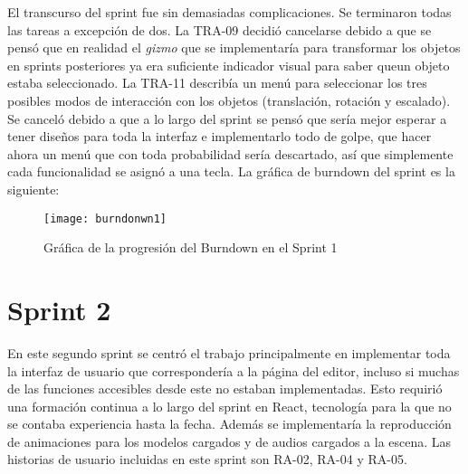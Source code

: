 El transcurso del sprint fue sin demasiadas complicaciones. Se terminaron todas las tareas a excepción de dos. La TRA-09 decidió cancelarse debido a que se pensó que en realidad el \textit{gizmo} que se implementaría para transformar los objetos en sprints posteriores ya era suficiente indicador visual para saber queun objeto estaba seleccionado. La TRA-11 describía un menú para seleccionar los tres posibles modos de interacción con los objetos (translación, rotación y escalado). Se canceló debido a que a lo largo del sprint se pensó que sería mejor esperar a tener diseños para toda la interfaz e implementarlo todo de golpe, que hacer ahora un menú que con toda probabilidad sería descartado, así que simplemente cada funcionalidad se asignó a una tecla. La gráfica de burndown del sprint es la siguiente:

\begin{figure}[h]
    \centering
    \texttt{[image: burndonwn1]}
    \caption[Burndown Sprint 1]{Gráfica de la progresión del Burndown en el Sprint 1}
\end{figure}

\section{Sprint 2}

En este segundo sprint se centró el trabajo principalmente en implementar toda la interfaz de usuario que correspondería a la página del editor, incluso si muchas de las funciones accesibles desde este no estaban implementadas. Esto requirió una formación continua a lo largo del sprint en React, tecnología para la que no se contaba experiencia hasta la fecha. Además se implementaría la reproducción de animaciones para los modelos cargados y de audios cargados a la escena. Las historias de usuario incluidas en este sprint son RA-02, RA-04 y RA-05.

\begin{table}[H]
\label{TRA-14}
\end{table}

